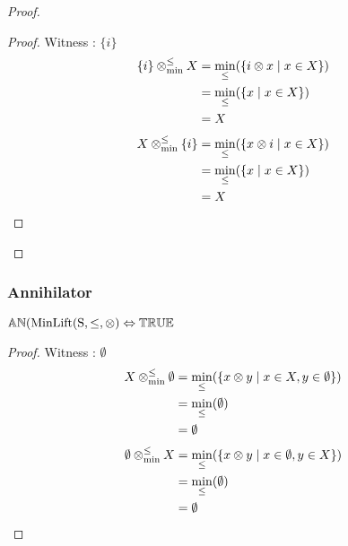 \documentclass[../Summary.tex]{subfiles}
\begin{document}
\begin{proof}
\begin{proof}

\vspace{0.5em}

Witness : $\{ i \}$
\begin{align*}
\{ i \} \mathbin{\otimes_{\min}^{\leq}} X 	& = \min_\leq(\{i \otimes x \mid x \in X\}) \\
					& = \min_\leq(\{x \mid x \in X\}) \\
					& = X
\end{align*}
\begin{align*}
X \mathbin{\otimes_{\min}^{\leq}} \{ i \} 	& = \min_\leq(\{x \otimes i \mid x \in X\}) \\
					& = \min_\leq(\{x \mid x \in X\}) \\
					& = X
\end{align*}
\end{proof}
\end{proof}







\subsubsection{Annihilator}

\begin{theorem}  \label{thm:minlift_an}
${\mathbb{AN}}(\mathrm{MinLift(S,\leq,\otimes)} \Leftrightarrow {\mathbb{TRUE}}$
\end{theorem}

\begin{proof}

\vspace{0.5em}

Witness : $\emptyset$
\begin{align*}
X \mathbin{\otimes_{\min}^{\leq}} \emptyset 	& = \min_\leq(\{ x \otimes y \mid x \in X, y \in \emptyset\}) \\
						& = \min_\leq(\emptyset) \\
						& = \emptyset
\end{align*}
\begin{align*}
\emptyset \mathbin{\otimes_{\min}^{\leq}} X 	& = \min_\leq(\{ x \otimes y \mid x \in \emptyset, y \in X\}) \\
						& = \min_\leq(\emptyset) \\
						& = \emptyset
\end{align*}
\end{proof}
\end{document}
